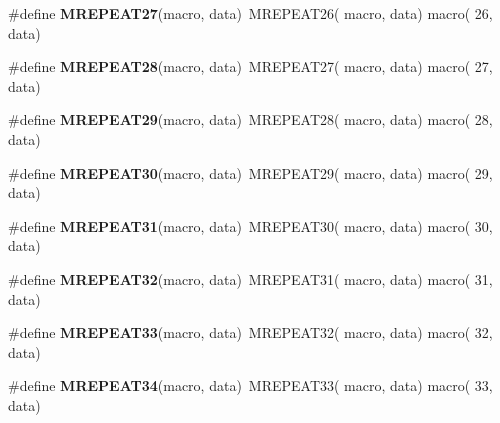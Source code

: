 \begin{DoxyCompactItemize}
\item 
\hypertarget{group__group__xmega__utils__mrepeat_gad5d25e8243cfb609c41b148d18af27ac}{\#define {\bfseries M\-R\-E\-P\-E\-A\-T27}(macro, data)~M\-R\-E\-P\-E\-A\-T26( macro, data)   macro( 26, data)}\label{group__group__xmega__utils__mrepeat_gad5d25e8243cfb609c41b148d18af27ac}

\item 
\hypertarget{group__group__xmega__utils__mrepeat_gab45193969a834715c8a19fc7c2d4a173}{\#define {\bfseries M\-R\-E\-P\-E\-A\-T28}(macro, data)~M\-R\-E\-P\-E\-A\-T27( macro, data)   macro( 27, data)}\label{group__group__xmega__utils__mrepeat_gab45193969a834715c8a19fc7c2d4a173}

\item 
\hypertarget{group__group__xmega__utils__mrepeat_ga45db5721fbef0548ff66d27c2d7c4393}{\#define {\bfseries M\-R\-E\-P\-E\-A\-T29}(macro, data)~M\-R\-E\-P\-E\-A\-T28( macro, data)   macro( 28, data)}\label{group__group__xmega__utils__mrepeat_ga45db5721fbef0548ff66d27c2d7c4393}

\item 
\hypertarget{group__group__xmega__utils__mrepeat_ga7b2a77fc380778a167d44b347ac338a8}{\#define {\bfseries M\-R\-E\-P\-E\-A\-T30}(macro, data)~M\-R\-E\-P\-E\-A\-T29( macro, data)   macro( 29, data)}\label{group__group__xmega__utils__mrepeat_ga7b2a77fc380778a167d44b347ac338a8}

\item 
\hypertarget{group__group__xmega__utils__mrepeat_ga8716e59c066fbf28d4a05a2df9ce1e7e}{\#define {\bfseries M\-R\-E\-P\-E\-A\-T31}(macro, data)~M\-R\-E\-P\-E\-A\-T30( macro, data)   macro( 30, data)}\label{group__group__xmega__utils__mrepeat_ga8716e59c066fbf28d4a05a2df9ce1e7e}

\item 
\hypertarget{group__group__xmega__utils__mrepeat_ga36c6234214aab94448eb8c65ecdc2f08}{\#define {\bfseries M\-R\-E\-P\-E\-A\-T32}(macro, data)~M\-R\-E\-P\-E\-A\-T31( macro, data)   macro( 31, data)}\label{group__group__xmega__utils__mrepeat_ga36c6234214aab94448eb8c65ecdc2f08}

\item 
\hypertarget{group__group__xmega__utils__mrepeat_ga36d12737d2ee8e77fbdef2f18c697164}{\#define {\bfseries M\-R\-E\-P\-E\-A\-T33}(macro, data)~M\-R\-E\-P\-E\-A\-T32( macro, data)   macro( 32, data)}\label{group__group__xmega__utils__mrepeat_ga36d12737d2ee8e77fbdef2f18c697164}

\item 
\hypertarget{group__group__xmega__utils__mrepeat_gad9540e7ec7a97aade78bdbfb0fbc1649}{\#define {\bfseries M\-R\-E\-P\-E\-A\-T34}(macro, data)~M\-R\-E\-P\-E\-A\-T33( macro, data)   macro( 33, data)}\label{group__group__xmega__utils__mrepeat_gad9540e7ec7a97aade78bdbfb0fbc1649}


\end{DoxyCompactItemize}

